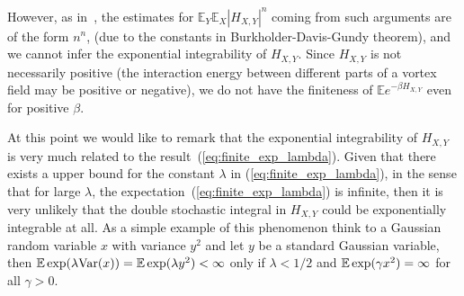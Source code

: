However, as in~\cite{Fl2}, the estimates for $\mathbb{E}_{Y}\mathbb{E}%
_{X}\left| H_{X,Y}\right| ^{n}$ coming from such arguments are of the
form $n^{n}$, (due to the constants in Burkholder-Davis-Gundy theorem), and
we cannot infer the exponential integrability of $H_{X,Y}$. Since $%
H_{X,Y}$ is not necessarily positive (the interaction energy between
different parts of a vortex field may be positive or negative), we do
not have the finiteness  of $\mathbb{E}e^{-\beta H_{X,Y}}$ even for positive $%
\beta $.

At this point we would like to remark that the exponential integrability of
$H_{X,Y}$ is very much related to the
result~(\ref{eq:finite_exp_lambda}). Given that there exists a upper bound for
the constant $\lambda$ in (\ref{eq:finite_exp_lambda}), in the sense that for
large $\lambda$, the expectation~(\ref{eq:finite_exp_lambda}) is infinite,
then it is very unlikely that  the double stochastic integral in $H_{X,Y}$ could
be exponentially integrable at all.  
As a simple example of this phenomenon think to a Gaussian random variable $x$
with variance $y^2$ and let $y$ be a standard Gaussian variable, then $\operatorname{{\mathbb E}}
\exp (\lambda \text{Var}(x)) =  \operatorname{{\mathbb E}} \exp (\lambda y^2) < \infty$ only if $\lambda <
1/2$ and $\operatorname{{\mathbb E}} \exp (\gamma x^2) = \infty$ for all $\gamma >0$.

  


